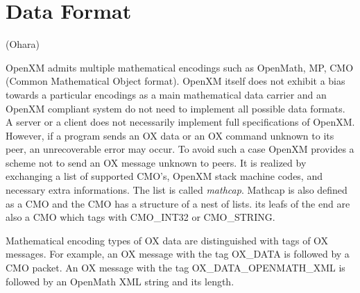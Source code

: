 
\section{Data Format}   (Ohara)

OpenXM admits multiple mathematical encodings such as OpenMath, MP, CMO
(Common Mathematical Object format).
OpenXM itself does not exhibit a bias towards a particular encodings 
as a main mathematical data carrier and an OpenXM compliant system do not need to
implement all possible data formats.
A server or a client does not necessarily implement full specifications
of OpenXM. 
However, if a program sends an OX data or an OX command unknown to its peer, 
an unrecoverable error may occur. 
To avoid such a case OpenXM provides a scheme not
to send an OX message unknown to peers. 
It is realized by exchanging a list of
supported CMO's, OpenXM stack machine codes, and necessary extra informations. 
The list is called {\it mathcap}.
Mathcap is also defined as a CMO and the CMO has a structure of a nest
of lists.  its leafs of the end are also a CMO which tags with
CMO\_INT32 or CMO\_STRING.

Mathematical encoding types of OX data are distinguished with tags
of OX messages.
For example,
an OX message with the tag 
OX\_DATA is followed by a CMO packet.
An OX message with the tag 
OX\_DATA\_OPENMATH\_XML is followed by 
an OpenMath XML string and its length.


